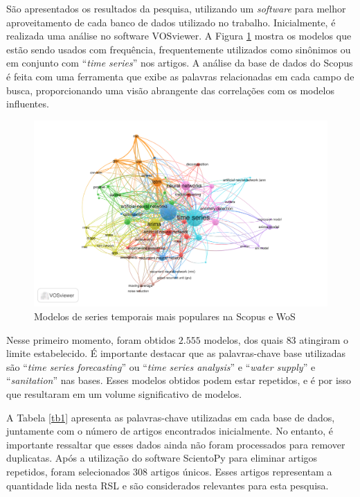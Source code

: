 São apresentados os resultados da pesquisa, utilizando um \textit{software} para melhor aproveitamento de cada banco de dados utilizado no trabalho. Inicialmente, é realizada uma análise no software VOSviewer.
A Figura \ref{fig:scopus-09-08} mostra os modelos que estão sendo usados com frequência, frequentemente utilizados como sinônimos ou em conjunto com ``\textit{time series}'' nos artigos. A análise da base de dados do Scopus é feita com uma ferramenta que exibe as palavras relacionadas em cada campo de busca, proporcionando uma visão abrangente das correlações com os modelos influentes.

\begin{figure}[!htb]
	\centering
	\caption{Modelos de series temporais mais populares na Scopus e WoS }
	\label{fig:scopus-09-08}
	\includegraphics[width=\linewidth]{Revisao/Figuras/base-wos-scopus}
	
	
\end{figure}

Nesse primeiro momento, foram obtidos $2.555$ modelos, dos quais $83$ atingiram o limite estabelecido. É importante destacar que as palavras-chave base utilizadas são ``\textit{time series forecasting}'' ou ``\textit{time series analysis}'' e ``\textit{water supply}'' e ``\textit{sanitation}'' nas bases. Esses modelos obtidos podem estar repetidos, e é por isso que resultaram em um volume significativo de modelos.


A Tabela \ref{tb1} apresenta as palavras-chave utilizadas em cada base de dados, juntamente com o número de artigos encontrados inicialmente. No entanto, é importante ressaltar que esses dados ainda não foram processados para remover duplicatas. Após a utilização do software ScientoPy \cite{scientopy} para eliminar artigos repetidos, foram selecionados $308$ artigos únicos. Esses artigos representam a quantidade lida nesta RSL e são considerados relevantes para esta pesquisa.


